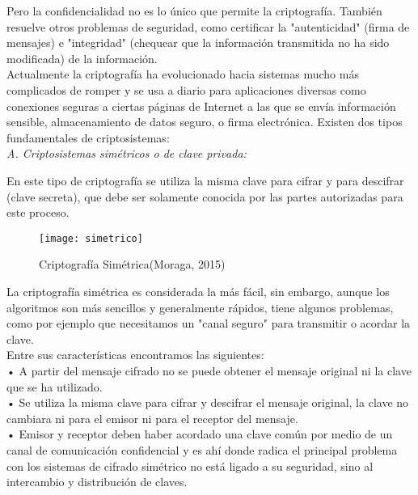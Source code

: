 \documentclass[9pt,24pt,twocolumn]{article}
\begin{document}
{Pero la confidencialidad no es lo único que permite la criptografía. También resuelve otros problemas de seguridad, como certificar la "autenticidad" (firma de mensajes) e "integridad" (chequear que la información transmitida no ha sido modificada) de la información.}
\\

{Actualmente la criptografía ha evolucionado hacia sistemas mucho más complicados de romper y se usa a diario para aplicaciones diversas como conexiones seguras a ciertas páginas de Internet a las que se envía información sensible, almacenamiento de datos seguro, o firma electrónica. Existen dos tipos fundamentales de criptosistemas:}
\\

\textit{A.  Criptosistemas simétricos o de clave privada:}

{En este tipo de criptografía se utiliza la misma clave para cifrar y para descifrar (clave secreta), que debe ser solamente conocida por las partes autorizadas para este proceso.}
\\

\begin{figure}[h]
  \centering
    \texttt{[image: simetrico]}
  \caption{Criptografía Simétrica(Moraga, 2015)}
  \label{fig:sim}
\end{figure}


{La criptografía simétrica es considerada la más fácil, sin embargo, aunque los algoritmos son más sencillos y generalmente rápidos, tiene algunos problemas, como por ejemplo que necesitamos un "canal seguro" para transmitir o acordar la clave.}
\\

{Entre sus características encontramos las siguientes:}
\\

{• A partir del mensaje cifrado no se puede obtener el mensaje original ni la clave que se ha utilizado.}
\\

{• Se utiliza la misma clave para cifrar y descifrar el mensaje original, la clave no cambiara ni para el emisor ni para el receptor del mensaje.}
\\

{• Emisor y receptor deben haber acordado una clave común por medio de un canal de comunicación confidencial y es ahí donde radica el principal problema con los sistemas de cifrado simétrico no está ligado a su seguridad, sino al intercambio y distribución de claves.}
\\
\end{document}
